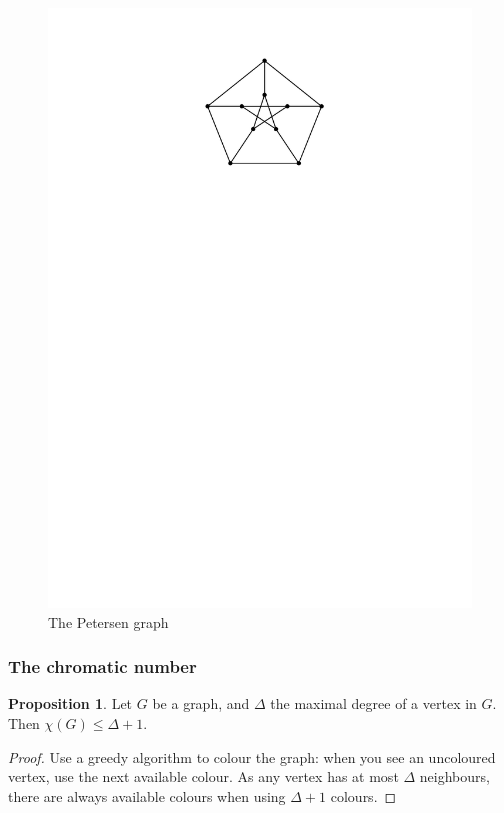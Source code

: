\documentclass[12pt]{amsart}
\theoremstyle{definition}
\newtheorem{prop}[thm]{Proposition}
\begin{document}
\begin{figure}
\includegraphics[scale=1]{../imgs/petersen}
\caption{The Petersen graph\label{fig:petersen}}
\end{figure}

\subsubsection{The chromatic number}

\begin{prop}
Let $G$ be a graph, and $\Delta $ the maximal degree of a vertex in $G$.
Then $\chi(G) \leq \Delta + 1$.
\end{prop}

\begin{proof}
Use a greedy algorithm to colour the graph: when you see an uncoloured vertex, use the next available colour.
As any vertex has at most $\Delta $ neighbours, there are always available colours when using $\Delta + 1$ colours.
\end{proof}
\end{document}
